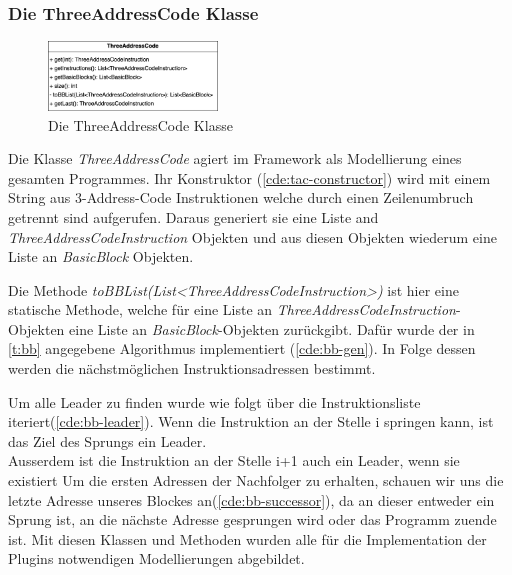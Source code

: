 \newpage
\subsubsection{Die ThreeAddressCode Klasse}
\begin{figure}
  \vspace{-15pt}
  \centering
  \includegraphics[width=0.4\textwidth]{fig/3AC_class_methods.png}
  \caption{Die ThreeAddressCode Klasse}
  \label{fig:ThreeAddressCode}
\end{figure}

Die Klasse \textit{ThreeAddressCode} agiert im Framework als Modellierung eines
gesamten Programmes. Ihr Konstruktor (\cref{cde:tac-constructor}) wird mit
einem String aus 3-Address-Code Instruktionen welche durch einen Zeilenumbruch getrennt sind
aufgerufen. Daraus generiert sie eine Liste and \textit{ThreeAddressCodeInstruction}
Objekten und aus diesen Objekten wiederum eine Liste an \textit{BasicBlock} Objekten.

Die Methode \textit{toBBList(List<ThreeAddressCodeInstruction>)} ist hier eine statische Methode, welche für eine
Liste an \textit{ThreeAddressCodeInstruction}-Objekten eine Liste an \textit{BasicBlock}-Objekten
zurückgibt. Dafür wurde der in \cref{t:bb} angegebene Algorithmus implementiert (\cref{cde:bb-gen}).
In Folge dessen werden die nächstmöglichen Instruktionsadressen bestimmt.

Um alle Leader zu finden wurde wie folgt über die Instruktionsliste iteriert(\cref{cde:bb-leader}).
Wenn die Instruktion an der Stelle i springen kann, ist das Ziel des Sprungs ein Leader.\\
Ausserdem ist die Instruktion an der Stelle i+1 auch ein Leader, wenn sie existiert
Um die ersten Adressen der Nachfolger zu erhalten, schauen wir uns die letzte
Adresse unseres Blockes an(\cref{cde:bb-successor}), da an dieser entweder ein Sprung ist,
an die nächste Adresse gesprungen wird oder das Programm zuende ist.
Mit diesen Klassen und Methoden wurden alle für die Implementation der Plugins
notwendigen Modellierungen abgebildet. 


\newpage
